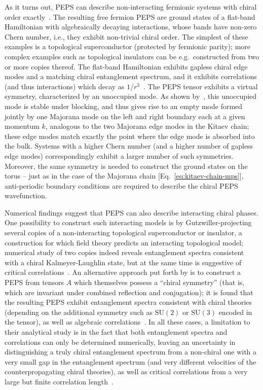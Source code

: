 \documentclass[rmp,aps,reprint,superscriptaddress,nobalancelastpage]{revtex4-1}
\begin{document}
As it turns out, PEPS can describe non-interacting fermionic systems with chiral order exactly~\cite[][an example is given in the Appendix]{dubail:chiral-fpeps,wahl:chiral-fPEPS}.  The resulting free fermion PEPS are ground states of a flat-band Hamiltonian with algebraically decaying interactions, whose bands have non-zero Chern number, i.e., they exhibit non-trivial chiral order. The simplest of these examples is a topological superconductor (protected by fermionic parity); more complex examples such as topological insulators can be e.g.\ constructed from two or more copies thereof.
The flat-band Hamiltonian exhibits gapless chiral edge modes and a matching chiral entanglement spectrum, and it exhibits correlations (and thus interactions) which decay as $1/r^3$~\cite{wahl:chiral-boundaries}.  The PEPS tensor exhibits a virtual symmetry, characterized by an unoccupied mode.  As shown by~\citet{wahl:chiral-boundaries}, this unoccupied mode is stable under blocking, and thus gives rise to an empty mode formed jointly by one Majorana mode on the left and right boundary each at a given momentum $k$, analogous to the two Majorana edge modes in the Kitaev chain; these edge modes match exactly the point where the edge mode is absorbed into the bulk.  Systems with a higher Chern number (and a higher number of gapless edge modes) correspondingly exhibit a larger number of such symmetries. Moreover, the same symmetry is needed to construct the ground states on the torus -- just as in the case of the Majorana chain [Eq.~\eqref{eq:kitaev-chain-mps}], anti-periodic boundary conditions are required to describe the chiral PEPS wavefunction.

Numerical findings suggest that PEPS can also describe interacting chiral phases. One possibility to construct such interacting models is by Gutzwiller-projecting several copies of a non-interacting topological superconductor or insulator, a construction for which field theory predicts an interacting topological model; numerical study of two copies indeed reveals entanglement spectra consistent with a chiral Kalmeyer-Laughlin state, but at the same time is suggestive of critical correlations~\cite{yang:chiral-topo-fpeps}. An alternative approach put forth by \citet{poilblanc:kl-peps-1,poilblanc:kl-peps-2} is to construct a PEPS from tensors $A$ which themselves possess a ``chiral symmetry'' (that is, which are invariant under combined reflection and conjugation); it is found that the resulting PEPS exhibit entanglement spectra consistent with chiral theories (depending on the additional symmetry such as $\mathrm{SU}(2)$ or $\mathrm{SU}(3)$ encoded in the tensor), as well as algebraic correlations~\cite{poilblanc:kl-peps-1,poilblanc:kl-peps-2,hackenbroich:chiral-su2,chen:peps_su2_2_csl,chen:su3_peps_csl,haegeman:medley}.
In all these cases, a limitation to their analytical study is in the fact that both entanglement spectra and correlations can only be determined numerically, leaving an uncertainty
in distinguishing a truly chiral entanglement spectrum from a non-chiral one with a very small gap in the entanglement spectrum (and very different velocities of the counterpropagating chiral theories), as well as critical correlations from a very large but finite correlation length~\cite{hackenbroich:chiral-su2}.
\end{document}
